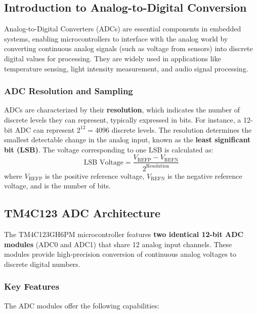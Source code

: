 \subsection{Introduction to Analog-to-Digital Conversion}
Analog-to-Digital Converters (ADCs) are essential components in embedded systems, enabling microcontrollers to interface with the analog world by converting continuous analog signals (such as voltage from sensors) into discrete digital values for processing. They are widely used in applications like temperature sensing, light intensity measurement, and audio signal processing.

\subsubsection{ADC Resolution and Sampling}
ADCs are characterized by their \textbf{resolution}, which indicates the number of discrete levels they can represent, typically expressed in bits. For instance, a 12-bit ADC can represent $2^{12} = 4096$ discrete levels. The resolution determines the smallest detectable change in the analog input, known as the \textbf{least significant bit (LSB)}. The voltage corresponding to one LSB is calculated as:
\begin{equation}
\text{LSB Voltage} = \frac{V_{\text{REFP}} - V_{\text{REFN}}}{2^{\text{Resolution}}}
\end{equation}
where $V_{\text{REFP}}$ is the positive reference voltage, $V_{\text{REFN}}$ is the negative reference voltage, and  is the number of bits.

\subsection{TM4C123 ADC Architecture}

The TM4C123GH6PM microcontroller features \textbf{two identical 12-bit ADC modules} (ADC0 and ADC1) that share 12 analog input channels. These modules provide high-precision conversion of continuous analog voltages to discrete digital numbers.

\subsubsection{Key Features}

The ADC modules offer the following capabilities:

